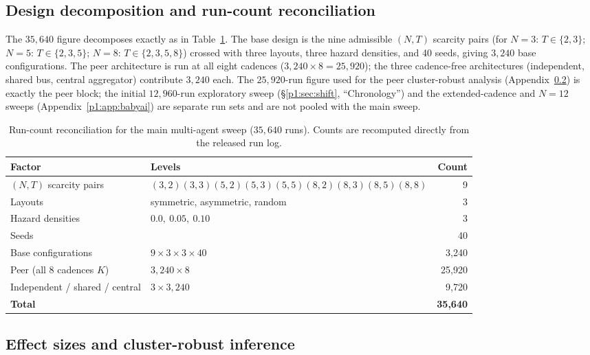 \documentclass{article}
\begin{document}
\subsection{Design decomposition and run-count reconciliation}
\label{p1:app:design}

The $35{,}640$ figure decomposes exactly as in Table~\ref{p1:tab:design}. The base design is the nine admissible $(N,T)$ scarcity pairs (for $N{=}3$: $T{\in}\{2,3\}$; $N{=}5$: $T{\in}\{2,3,5\}$; $N{=}8$: $T{\in}\{2,3,5,8\}$) crossed with three layouts, three hazard densities, and 40 seeds, giving $3{,}240$ base configurations. The peer architecture is run at all eight cadences ($3{,}240\times 8 = 25{,}920$); the three cadence-free architectures (independent, shared bus, central aggregator) contribute $3{,}240$ each. The $25{,}920$-run figure used for the peer cluster-robust analysis (Appendix~\ref{p1:app:effect-sizes}) is exactly the peer block; the initial $12{,}960$-run exploratory sweep (\S\ref{p1:sec:shift}, ``Chronology'') and the extended-cadence and $N{=}12$ sweeps (Appendix~\ref{p1:app:babyai}) are separate run sets and are not pooled with the main sweep.

\begin{table}[h]
\caption{Run-count reconciliation for the main multi-agent sweep ($35{,}640$ runs). Counts are recomputed directly from the released run log.}
\label{p1:tab:design}
\centering
\small
\begin{tabular}{l l r}
\toprule
Factor & Levels & Count \\
\midrule
$(N,T)$ scarcity pairs & $(3,2)(3,3)(5,2)(5,3)(5,5)(8,2)(8,3)(8,5)(8,8)$ & 9 \\
Layouts & symmetric, asymmetric, random & 3 \\
Hazard densities & $0.0,\ 0.05,\ 0.10$ & 3 \\
Seeds & & 40 \\
\midrule
Base configurations & $9\times3\times3\times40$ & 3{,}240 \\
Peer (all 8 cadences $K$) & $3{,}240\times8$ & 25{,}920 \\
Independent / shared / central & $3\times3{,}240$ & 9{,}720 \\
\midrule
\textbf{Total} & & \textbf{35{,}640} \\
\bottomrule
\end{tabular}
\end{table}

\subsection{Effect sizes and cluster-robust inference}
\label{p1:app:effect-sizes}
\end{document}
